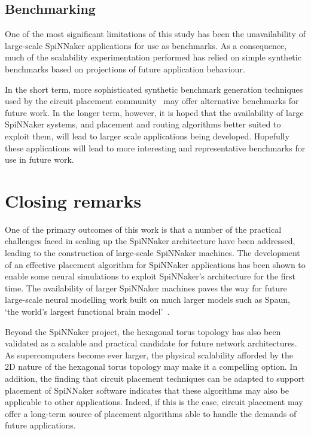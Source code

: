 		\subsection{Benchmarking}
			
			One of the most significant limitations of this study has been the
			unavailability of large-scale SpiNNaker applications for use as
			benchmarks. As a consequence, much of the scalability experimentation
			performed has relied on simple synthetic benchmarks based on projections
			of future application behaviour.
			
			In the short term, more sophisticated synthetic benchmark generation
			techniques used by the circuit placement community~\cite{nam07} may offer
			alternative benchmarks for future work. In the longer term, however, it
			is hoped that the availability of large SpiNNaker systems, and placement
			and routing algorithms better suited to exploit them, will lead to larger
			scale applications being developed. Hopefully these applications will
			lead to more interesting and representative benchmarks for use in future
			work.
	
	\section{Closing remarks}
		
		One of the primary outcomes of this work is that a number of the practical
		challenges faced in scaling up the SpiNNaker architecture have been
		addressed, leading to the construction of large-scale SpiNNaker machines.
		The development of an effective placement algorithm for SpiNNaker
		applications has been shown to enable some neural simulations to exploit
		SpiNNaker's architecture for the first time. The availability of larger
		SpiNNaker machines paves the way for future large-scale neural modelling
		work built on much larger models such as Spaun, `the world's largest
		functional brain model'~\cite{eliasmith12}.
		
		Beyond the SpiNNaker project, the hexagonal torus topology has also been
		validated as a scalable and practical candidate for future network
		architectures. As supercomputers become ever larger, the physical
		scalability afforded by the 2D nature of the hexagonal torus topology may
		make it a compelling option. In addition, the finding that circuit
		placement techniques can be adapted to support placement of SpiNNaker
		software indicates that these algorithms may also be applicable to other
		applications. Indeed, if this is the case, circuit placement may offer a
		long-term source of placement algorithms able to handle the demands of
		future applications.
		
